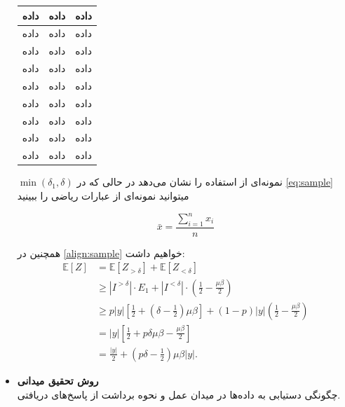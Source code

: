 \begin{itemize}[leftmargin=*]
\begin{longtable}{|c|c|c|}
    \hline
    داده & داده & داده \\
    \hline
    داده & داده & داده \\
    \hline
    داده & داده & داده \\
    \hline
    داده & داده & داده \\
    \hline
    داده & داده & داده \\
    \hline
    داده & داده & داده \\
    \hline
    داده & داده & داده \\
    \hline
    داده & داده & داده \\
    \hline
    داده & داده & داده \\
    \hline

    \end{longtable}

    \(\min(\delta_1, \delta)\)  نمونه‌ای از استفاده  را نشان می‌دهد در حالی که در \ref{eq:sample} میتوانید نمونه‌ای از عبارات ریاضی را ببینید

    \begin{equation}
        \label{eq:sample}
        \bar{x} = \frac{\sum_{i=1}^{n} x_i}{n}
    \end{equation}


    همچنین در \ref{align:sample} خواهیم داشت:
    \begin{align}
    \label{align:sample}
    \mathbb{E}[Z] 
    &= \mathbb{E}[Z_{>\delta}] + \mathbb{E}[Z_{<\delta}] \\
    &\geq |I^{>\delta}| \cdot E_1 + |I^{<\delta}| \cdot \left(\frac{1}{2} - \frac{\mu\beta}{2}\right) \\
    &\geq p|y| \left[\frac{1}{2} + \left(\delta - \frac{1}{2}\right)\mu\beta\right] 
    + (1-p)|y| \left(\frac{1}{2} - \frac{\mu\beta}{2}\right) \\
    &= |y| \left[ \frac{1}{2} + p\delta\mu\beta - \frac{\mu\beta}{2} \right] \\
    &= \frac{|y|}{2} + \left(p\delta - \frac{1}{2}\right) \mu\beta |y|.
    \end{align}

    \item \textbf{روش تحقیق میدانی}\\
    چگونگی دستیابی به داده‌ها در میدان عمل و نحوه برداشت از پاسخ‌های دریافتی.

\end{itemize}



